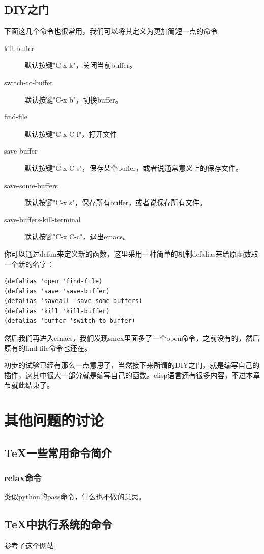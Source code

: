 \documentclass[11pt,oneside]{book}
\begin{document}
\section{DIY之门}
下面这几个命令也很常用，我们可以将其定义为更加简短一点的命令
\begin{description}
\item[kill-buffer] 默认按键"C-x k"，关闭当前buffer。
\item[switch-to-buffer] 默认按键"C-x b"，切换buffer。
\item[find-file] 默认按键"C-x C-f"，打开文件
\item[save-buffer] 默认按键"C-x C-s"，保存某个buffer，或者说通常意义上的保存文件。
\item[save-some-buffers] 默认按键"C-x s"，保存所有buffer，或者说保存所有文件。
\item[save-buffers-kill-terminal] 默认按键"C-x C-c"，退出emacs。
\end{description}

你可以通过defun来定义新的函数，这里采用一种简单的机制defalias来给原函数取一个新的名字：
\begin{Verbatim}
(defalias 'open 'find-file)
(defalias 'save 'save-buffer)
(defalias 'saveall 'save-some-buffers)
(defalias 'kill 'kill-buffer)
(defalias 'buffer 'switch-to-buffer)
\end{Verbatim}
然后我们再进入emacs，我们发现smex里面多了一个open命令，之前没有的，然后原有的find-file命令也还在。

初步的试验已经有那么一点意思了，当然接下来所谓的DIY之门，就是编写自己的插件，这其中很大一部分就是编写自己的函数。elisp语言还有很多内容，不过本章节就此结束了。


\chapter{其他问题的讨论}
\section{TeX一些常用命令简介}
\subsection{relax命令}
类似python的pass命令，什么也不做的意思。

\section{TeX中执行系统的命令}
\href{http://tex.stackexchange.com/questions/20444/what-are-immediate-write18-and-how-does-one-use-them}{参考了这个网站}
\end{document}
